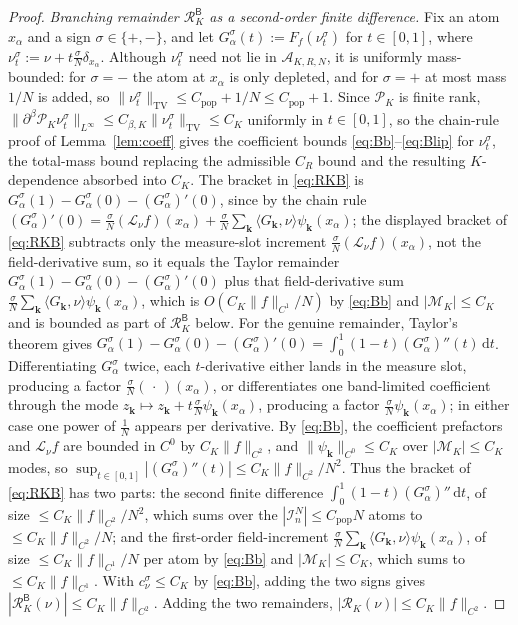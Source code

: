 \documentclass[a4paper,fleqn]{cas-sc}
\theoremstyle{definition}
\theoremstyle{remark}
\begin{document}
\begin{proof}
\emph{Branching remainder $\mathcal R_K^{\mathsf B}$ as a second-order finite difference.} Fix an atom
$x_\alpha$ and a sign $\sigma\in\{+,-\}$, and let
$G_\alpha^\sigma(t):=F_f(\nu_t^\sigma)$ for $t\in[0,1]$, where $\nu_t^\sigma:=\nu+t\tfrac{\sigma}N\delta_{x_\alpha}$.
Although $\nu_t^\sigma$ need not lie in $\mathcal A_{K,R,N}$, it is uniformly mass-bounded: for $\sigma=-$
the atom at $x_\alpha$ is only depleted, and for $\sigma=+$ at most mass $1/N$ is added, so
$\|\nu_t^\sigma\|_{\mathrm{TV}}\le C_{\mathrm{pop}}+1/N\le C_{\mathrm{pop}}+1$. Since $\mathcal P_K$ is finite rank,
$\|\partial^\beta\mathcal P_K\nu_t^\sigma\|_{L^\infty}\le C_{\beta,K}\|\nu_t^\sigma\|_{\mathrm{TV}}\le C_K$
uniformly in $t\in[0,1]$, so the chain-rule proof of Lemma~\ref{lem:coeff} gives the coefficient bounds
\eqref{eq:Bb}--\eqref{eq:Blip} for $\nu_t^\sigma$, the total-mass bound replacing the admissible
$C_R$ bound and the resulting $K$-dependence absorbed into $C_K$. The bracket in \eqref{eq:RKB} is
$G_\alpha^\sigma(1)-G_\alpha^\sigma(0)-(G_\alpha^\sigma)'(0)$, since by the chain rule
$(G_\alpha^\sigma)'(0)=\tfrac{\sigma}N(\mathcal L_\nu f)(x_\alpha)+\tfrac{\sigma}N\sum_{\mathbf k}\langle G_{\mathbf k},\nu\rangle\psi_{\mathbf k}(x_\alpha)$;
the displayed bracket of \eqref{eq:RKB} subtracts only the measure-slot increment
$\tfrac{\sigma}N(\mathcal L_\nu f)(x_\alpha)$, not the field-derivative sum, so it equals the Taylor remainder
$G_\alpha^\sigma(1)-G_\alpha^\sigma(0)-(G_\alpha^\sigma)'(0)$ plus that field-derivative sum
$\tfrac{\sigma}N\sum_{\mathbf k}\langle G_{\mathbf k},\nu\rangle\psi_{\mathbf k}(x_\alpha)$, which is
$O(C_K\|f\|_{C^1}/N)$ by \eqref{eq:Bb} and $|\mathcal M_K|\le C_K$ and is bounded as part of
$\mathcal R_K^{\mathsf B}$ below. For the
genuine remainder, Taylor's theorem gives
$G_\alpha^\sigma(1)-G_\alpha^\sigma(0)-(G_\alpha^\sigma)'(0)=\int_0^1(1-t)(G_\alpha^\sigma)''(t)\,\mathrm dt$.
Differentiating $G_\alpha^\sigma$ twice, each $t$-derivative either lands in the measure slot,
producing a factor $\tfrac{\sigma}N(\,\cdot\,)(x_\alpha)$, or differentiates one band-limited
coefficient through the mode $z_{\mathbf k}\mapsto z_{\mathbf k}+t\tfrac{\sigma}N\psi_{\mathbf k}(x_\alpha)$,
producing a factor $\tfrac{\sigma}N\psi_{\mathbf k}(x_\alpha)$; in either case one power of $\tfrac1N$
appears per derivative. By \eqref{eq:Bb}, the coefficient prefactors and $\mathcal L_\nu f$ are bounded in $C^0$ by
$C_K\|f\|_{C^2}$, and $\|\psi_{\mathbf k}\|_{C^0}\le C_K$ over $|\mathcal M_K|\le C_K$ modes, so
$\sup_{t\in[0,1]}|(G_\alpha^\sigma)''(t)|\le C_K\|f\|_{C^2}/N^2$. Thus the bracket of
\eqref{eq:RKB} has two parts: the second finite difference $\int_0^1(1-t)(G_\alpha^\sigma)''\,\mathrm dt$,
of size $\le C_K\|f\|_{C^2}/N^2$, which sums over the $|\mathcal I^N_n|\le C_{\mathrm{pop}}N$ atoms to
$\le C_K\|f\|_{C^2}/N$; and the first-order field-increment
$\tfrac{\sigma}N\sum_{\mathbf k}\langle G_{\mathbf k},\nu\rangle\psi_{\mathbf k}(x_\alpha)$, of size
$\le C_K\|f\|_{C^1}/N$ per atom by \eqref{eq:Bb} and $|\mathcal M_K|\le C_K$, which sums to
$\le C_K\|f\|_{C^1}$. With $c^\sigma_\nu\le C_K$ by \eqref{eq:Bb}, adding the two signs gives
$|\mathcal R_K^{\mathsf B}(\nu)|\le C_K\|f\|_{C^2}$.
Adding the two remainders, $|\mathcal R_K(\nu)|\le C_K\|f\|_{C^2}$.


\end{proof}
\end{document}

